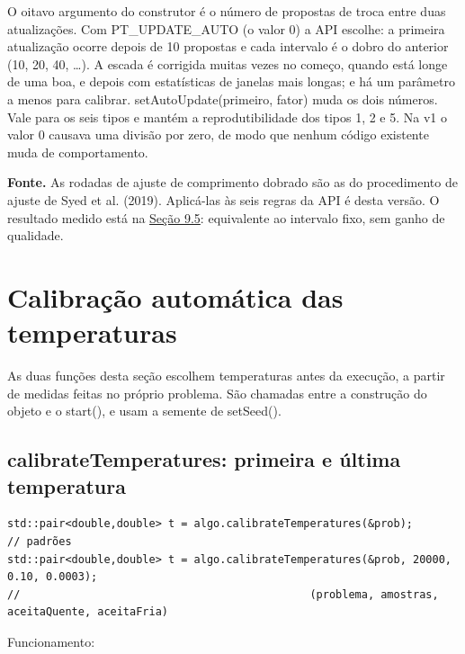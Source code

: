 \documentclass[10pt,a4paper]{article}
\newcommand{\code}[1]{{\ttfamily #1}}
\begin{document}
O oitavo argumento do construtor é o número de propostas de troca entre duas atualizações. Com \code{PT\_UPDATE\_AUTO} (o valor 0) a API escolhe: a primeira atualização ocorre depois de 10 propostas e cada intervalo é o dobro do anterior (10, 20, 40, \dots). A escada é corrigida muitas vezes no começo, quando está longe de uma boa, e depois com estatísticas de janelas mais longas; e há um parâmetro a menos para calibrar. \code{setAutoUpdate(primeiro, fator)} muda os dois números. Vale para os seis tipos e mantém a reprodutibilidade dos tipos 1, 2 e 5. Na v1 o valor 0 causava uma divisão por zero, de modo que nenhum código existente muda de comportamento.

\begin{fonte}
\textbf{Fonte.} As rodadas de ajuste de comprimento dobrado são as do procedimento de ajuste de Syed et al. (2019). Aplicá-las às seis regras da API é desta versão. O resultado medido está na \hyperref[s9]{Seção 9.5}: equivalente ao intervalo fixo, sem ganho de qualidade.
\end{fonte}

\section{Calibração automática das temperaturas}\label{s8}

As duas funções desta seção escolhem temperaturas antes da execução, a partir de medidas feitas no próprio problema. São chamadas entre a construção do objeto e o \code{start()}, e usam a semente de \code{setSeed()}.

\subsection{\code{calibrateTemperatures}: primeira e última temperatura}

\begin{lstlisting}[style=cpp]
std::pair<double,double> t = algo.calibrateTemperatures(&prob);                // padrões
std::pair<double,double> t = algo.calibrateTemperatures(&prob, 20000, 0.10, 0.0003);
//                                             (problema, amostras, aceitaQuente, aceitaFria)
\end{lstlisting}

Funcionamento:
\end{document}
